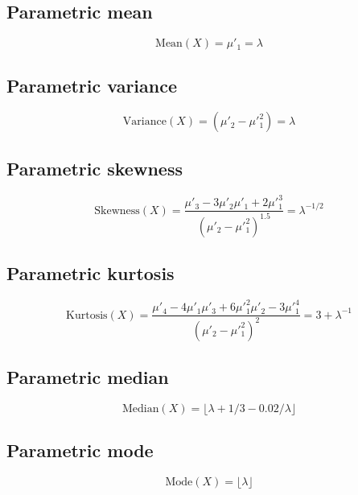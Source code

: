 \documentclass{article}
\begin{document}
\subsection{Parametric mean}
\begin{equation*} \mathrm{Mean}(X)=\mu'_{1}=\lambda \end{equation*}
\subsection{Parametric variance}
\begin{equation*} \mathrm{Variance}(X)=(\mu'_{2}-\mu'^{2}_{1})=\lambda \end{equation*}
\subsection{Parametric skewness}
\begin{equation*} \mathrm{Skewness}(X)=\frac{\mu'_{3}-3\mu'_{2}\mu'_{1}+2\mu'^{3}_{1}}{(\mu'_{2}-\mu'^{2}_{1})^{1.5}}=\lambda^{-1/2} \end{equation*}
\subsection{Parametric kurtosis}
\begin{equation*} \mathrm{Kurtosis}(X)=\frac{\mu'_{4}-4\mu'_{1}\mu'_{3}+6\mu'^{2}_{1}\mu'_{2}-3\mu'^{4}_{1}}{(\mu'_{2}-\mu'^{2}_{1})^{2}}=3+\lambda^{-1} \end{equation*}
\subsection{Parametric median}
\begin{equation*} \mathrm{Median}(X)=\lfloor\lambda+1/3-0.02/\lambda\rfloor \end{equation*}
\subsection{Parametric mode}
\begin{equation*} \mathrm{Mode}(X)=\lfloor\lambda\rfloor \end{equation*}
\end{document}
